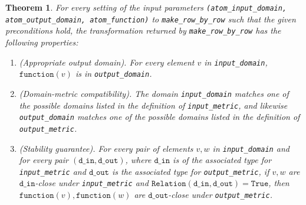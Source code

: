 \documentclass[11pt,a4paper]{article}
\newtheorem{theorem}{Theorem}[section]
\newcommand{\din}{\texttt{d\_in}}
\newcommand{\dout}{\texttt{d\_out}}
\newcommand{\Relation}{\texttt{Relation}}
\newcommand{\True}{\texttt{True}}
\newcommand{\function}{\texttt{function}}
\begin{document}
\begin{theorem}
    For every setting of the input parameters \texttt{(atom\_input\_domain, atom\_output\_domain, atom\_function)} to \texttt{make\_row\_by\_row} such that the given preconditions
    hold, the transformation returned by \texttt{make\_row\_by\_row} has the following properties:
    \begin{enumerate}
        \item \textup{(Appropriate output domain).} For every element $v$ in \texttt{input\_domain}, $\function(v)$ is in \texttt{output\_domain}. %
        
        \item \textup{(Domain-metric compatibility).} The domain \texttt{input\_domain} matches one of the possible domains listed in the definition of \texttt{input\_metric}, and likewise \texttt{output\_domain} matches one of the possible domains listed in the definition of \texttt{output\_metric}.
        
        \item \textup{(Stability guarantee).} For every pair of elements $v, w$ in \texttt{input\_domain} and for every pair $(\din, \dout)$, where $\din$ is of the associated type for \texttt{input\_metric} and $\dout$ is the associated type for \texttt{output\_metric}, if $v,w$ are $\din$-close under \texttt{input\_metric} and $\Relation(\din, \dout) = \True$, then $\function(v), \function(w)$ are $\dout$-close under \texttt{output\_metric}.
    \end{enumerate}
\end{theorem}
\end{document}
